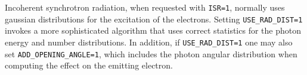 Incoherent synchrotron radiation, when requested with {\tt ISR=1},
normally uses gaussian distributions for the excitation of the electrons.
Setting {\tt USE\_RAD\_DIST=1} invokes a more sophisticated algorithm that
uses correct statistics for the photon energy and number distributions.
In addition, if {\tt USE\_RAD\_DIST=1} one may also set {\tt ADD\_OPENING\_ANGLE=1},
which includes the photon angular distribution when computing the effect on 
the emitting electron.  
